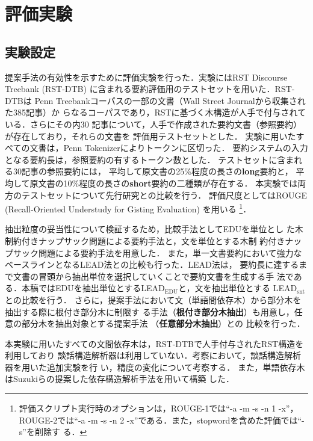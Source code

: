 \documentclass[japanese]{jnlp_1.4}
\begin{document}
\section{評価実験}

\vspace{-0.5\Cvs}
\subsection{実験設定}

提案手法の有効性を示すために評価実験を行った．実験にはRST Discourse Treebank
(RST-DTB) \cite{carlson:01}に含まれる要約評価用のテストセットを用いた．RST-DTBは
Penn Treebankコーパスの一部の文書（Wall Street Journalから収集された385記事）か
らなるコーパスであり，RSTに基づく木構造が人手で付与されている．さらにその内30
記事について，人手で作成された要約文書（参照要約）が存在しており，それらの文書を
評価用テストセットとした．
実験に用いたすべての文書は，Penn Tokenizerによりトークンに区切った．
要約システムの入力となる要約長は，参照要約の有するトークン数とした．
テストセットに含まれる30記事の参照要約には，
平均して原文書の25\%程度の長さの{\bf long}要約と，
平均して原文書の10\%程度の長さの{\bf short}要約の二種類が存在する．
本実験では両方のテストセットについて先行研究との比較を行う．
評価尺度としてはROUGE
(Recall-Oriented Understudy for Gisting Evaluation)\cite{lin:04}
を用いる
\footnote{評価スクリプト実行時のオプションは，ROUGE-1では``-a -m -s -n 1 -x''，
ROUGE-2では``-a -m -s -n 2 -x''である．また，stopwordを含めた評価では``-s''を削除す
る．}．

抽出粒度の妥当性について検証するため，比較手法としてEDUを単位とし
た木制約付きナップサック問題による要約手法\cite{hirao:13}と，文を単位とする木制
約付きナップサック問題による要約手法を用意した．
また，単一文書要約において強力なベースラインとなるLEAD法との比較も行った．LEAD法は，
要約長に達するまで文書の冒頭から抽出単位を選択していくことで要約文書を生成する手
法である．本稿ではEDUを抽出単位とするLEAD$_\text{EDU}$と，文を抽出単位とする
LEAD$_\text{snt}$との比較を行う．
さらに，提案手法において文（単語間依存木）から部分木を抽出する際に根付き部分木に制限す
る手法（{\bf 根付き部分木抽出}）も用意し，任意の部分木を抽出対象とする提案手法
（{\bf 任意部分木抽出}）との
比較を行った．



本実験に用いたすべての文間依存木は，RST-DTBで人手付与されたRST構造を利用しており
談話構造解析器は利用していない．考察において，談話構造解析器を用いた追加実験を行
い，精度の変化について考察する．
また，単語依存木はSuzukiらの提案した依存構造解析手法\cite{suzuki:09}を用いて構築
した．
\end{document}
